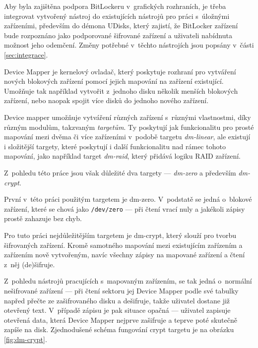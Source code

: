 Aby byla zajištěna podpora BitLockeru v~grafických rozhraních, je třeba integrovat vytvořený nástroj do existujících nástrojů pro práci s~úložnými zařízeními, především do démona UDisks, který zajistí, že BitLocker zařízení bude rozpoznáno jako podporované šifrované zařízení a uživateli nabídnuta možnost jeho odemčení. Změny potřebné v~těchto nástrojích jsou popsány v~části \ref{sec:integrace}.

\label{sec:device-mapper}

Device Mapper je kernelový ovladač, který poskytuje rozhraní pro vytváření nových blokových zařízení pomocí jejich mapování na zařízení existující. Umožňuje tak například vytvořit z~jednoho disku několik menších blokových zařízení, nebo naopak spojit více disků do jednoho nového zařízení.\cite{RedHat2019}

Device mapper umožňuje vytváření různých zařízení s~různými vlastnostmi, díky různým modulům, takzvaným \emph{targetům}. Ty poskytují jak funkcionalitu pro prosté mapování mezi dvěma či více zařízeními v~podobě targetu \emph{dm-linear}, ale existují i složitější targety, které poskytují i další funkcionalitu nad rámec tohoto mapování, jako například target \emph{dm-raid}, který přidává logiku RAID zařízení.

Z~pohledu této práce jsou však důležité dva targety --- \emph{dm-zero} a především \emph{dm-crypt}.


První v~této práci použitým targetem je dm-zero. V~podstatě se jedná o~blokové zařízení, které se chová jako \texttt{/dev/zero} --- při čtení vrací nuly a jakékoli zápisy prostě zahazuje bez chyb.\cite{KernelZero}


Pro tuto práci nejdůležitějším targetem je dm-crypt, který slouží pro tvorbu šifrovaných zařízení. Kromě samotného mapování mezi existujícím zařízením a zařízením nově vytvořeným, navíc všechny zápisy na mapované zařízení a čtení z~něj (de)šifruje.\cite{Broz2018}

Z~pohledu nástrojů pracujících s~mapovaným zařízením, se tak jedná o~normální nešifrované zařízení --- při čtení sektoru jej Device Mapper podle své tabulky napřed přečte ze zašifrovaného disku a dešifruje, takže uživatel dostane již otevřený text. V~případě zápisu je pak situace opačná --- uživatel zapisuje otevřená data, která Device Mapper nejprve zašifruje a teprve poté skutečně zapíše na disk. Zjednodušené schéma fungování crypt targetu je na obrázku \ref{fig:dm-crypt}.

